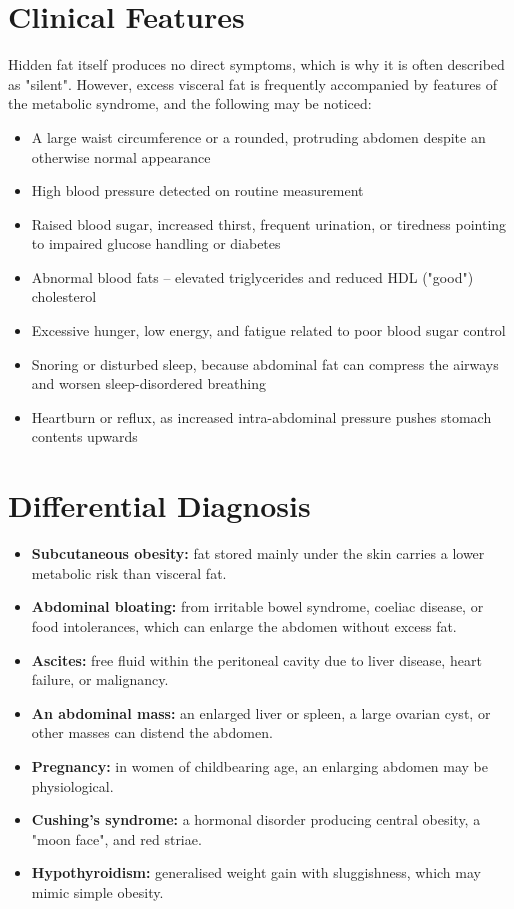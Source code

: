 \section*{Clinical Features}
Hidden fat itself produces no direct symptoms, which is why it is often described as "silent". However, excess visceral fat is frequently accompanied by features of the metabolic syndrome, and the following may be noticed:
\begin{itemize}
    \item A large waist circumference or a rounded, protruding abdomen despite an otherwise normal appearance
    \item High blood pressure detected on routine measurement
    \item Raised blood sugar, increased thirst, frequent urination, or tiredness pointing to impaired glucose handling or diabetes
    \item Abnormal blood fats -- elevated triglycerides and reduced HDL ("good") cholesterol
    \item Excessive hunger, low energy, and fatigue related to poor blood sugar control
    \item Snoring or disturbed sleep, because abdominal fat can compress the airways and worsen sleep-disordered breathing
    \item Heartburn or reflux, as increased intra-abdominal pressure pushes stomach contents upwards
\end{itemize}

\section*{Differential Diagnosis}
\begin{itemize}
    \item \textbf{Subcutaneous obesity:} fat stored mainly under the skin carries a lower metabolic risk than visceral fat.
    \item \textbf{Abdominal bloating:} from irritable bowel syndrome, coeliac disease, or food intolerances, which can enlarge the abdomen without excess fat.
    \item \textbf{Ascites:} free fluid within the peritoneal cavity due to liver disease, heart failure, or malignancy.
    \item \textbf{An abdominal mass:} an enlarged liver or spleen, a large ovarian cyst, or other masses can distend the abdomen.
    \item \textbf{Pregnancy:} in women of childbearing age, an enlarging abdomen may be physiological.
    \item \textbf{Cushing's syndrome:} a hormonal disorder producing central obesity, a "moon face", and red striae.
    \item \textbf{Hypothyroidism:} generalised weight gain with sluggishness, which may mimic simple obesity.
\end{itemize}

